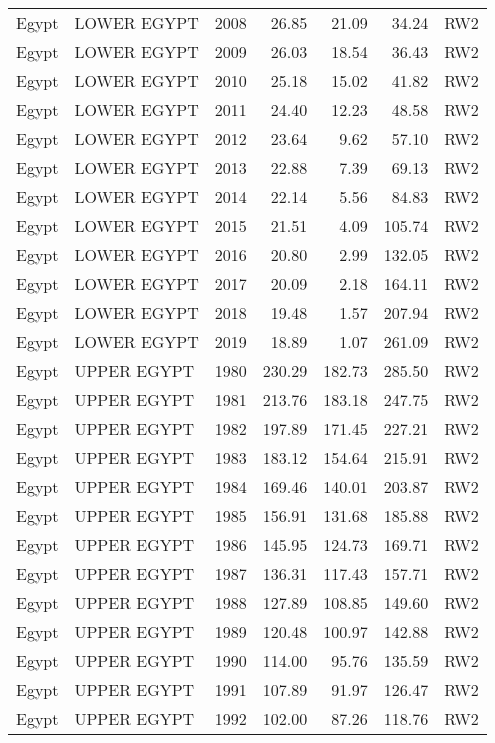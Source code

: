 \begin{longtable}{lllrrrl}
  Egypt & LOWER EGYPT & 2008 & 26.85 & 21.09 & 34.24 & RW2 \\ 
  Egypt & LOWER EGYPT & 2009 & 26.03 & 18.54 & 36.43 & RW2 \\ 
  Egypt & LOWER EGYPT & 2010 & 25.18 & 15.02 & 41.82 & RW2 \\ 
  Egypt & LOWER EGYPT & 2011 & 24.40 & 12.23 & 48.58 & RW2 \\ 
  Egypt & LOWER EGYPT & 2012 & 23.64 & 9.62 & 57.10 & RW2 \\ 
  Egypt & LOWER EGYPT & 2013 & 22.88 & 7.39 & 69.13 & RW2 \\ 
  Egypt & LOWER EGYPT & 2014 & 22.14 & 5.56 & 84.83 & RW2 \\ 
  Egypt & LOWER EGYPT & 2015 & 21.51 & 4.09 & 105.74 & RW2 \\ 
  Egypt & LOWER EGYPT & 2016 & 20.80 & 2.99 & 132.05 & RW2 \\ 
  Egypt & LOWER EGYPT & 2017 & 20.09 & 2.18 & 164.11 & RW2 \\ 
  Egypt & LOWER EGYPT & 2018 & 19.48 & 1.57 & 207.94 & RW2 \\ 
  Egypt & LOWER EGYPT & 2019 & 18.89 & 1.07 & 261.09 & RW2 \\ 
  Egypt & UPPER EGYPT & 1980 & 230.29 & 182.73 & 285.50 & RW2 \\ 
  Egypt & UPPER EGYPT & 1981 & 213.76 & 183.18 & 247.75 & RW2 \\ 
  Egypt & UPPER EGYPT & 1982 & 197.89 & 171.45 & 227.21 & RW2 \\ 
  Egypt & UPPER EGYPT & 1983 & 183.12 & 154.64 & 215.91 & RW2 \\ 
  Egypt & UPPER EGYPT & 1984 & 169.46 & 140.01 & 203.87 & RW2 \\ 
  Egypt & UPPER EGYPT & 1985 & 156.91 & 131.68 & 185.88 & RW2 \\ 
  Egypt & UPPER EGYPT & 1986 & 145.95 & 124.73 & 169.71 & RW2 \\ 
  Egypt & UPPER EGYPT & 1987 & 136.31 & 117.43 & 157.71 & RW2 \\ 
  Egypt & UPPER EGYPT & 1988 & 127.89 & 108.85 & 149.60 & RW2 \\ 
  Egypt & UPPER EGYPT & 1989 & 120.48 & 100.97 & 142.88 & RW2 \\ 
  Egypt & UPPER EGYPT & 1990 & 114.00 & 95.76 & 135.59 & RW2 \\ 
  Egypt & UPPER EGYPT & 1991 & 107.89 & 91.97 & 126.47 & RW2 \\ 
  Egypt & UPPER EGYPT & 1992 & 102.00 & 87.26 & 118.76 & RW2 \\ 

\end{longtable}
